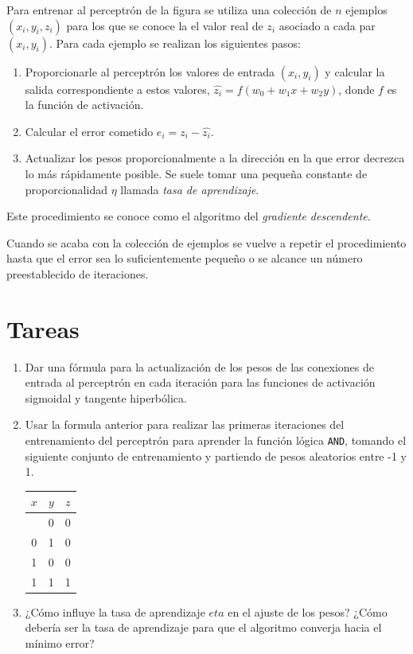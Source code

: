 \documentclass[
  a4paper,
]{scrreport}
\providecommand{\tightlist}{%
  \setlength{\itemsep}{0pt}\setlength{\parskip}{0pt}}\usepackage{longtable,booktabs,array}
\begin{document}
Para entrenar al perceptrón de la figura se utiliza una colección de
\(n\) ejemplos \((x_i,y_i,z_i)\) para los que se conoce la el valor real
de \(z_i\) asociado a cada par \((x_i,y_i)\). Para cada ejemplo se
realizan los siguientes pasos:

\begin{enumerate}
\def\labelenumi{\arabic{enumi}.}
\tightlist
\item
  Proporcionarle al perceptrón los valores de entrada \((x_i,y_i)\) y
  calcular la salida correspondiente a estos valores,
  \(\hat{z_i} = f(w_0+w_1x+w_2y)\), donde \(f\) es la función de
  activación.
\item
  Calcular el error cometido \(e_i = z_i-\hat{z_i}\).
\item
  Actualizar los pesos proporcionalmente a la dirección en la que error
  decrezca lo más rápidamente posible. Se suele tomar una pequeña
  constante de proporcionalidad \(\eta\) llamada \emph{tasa de
  aprendizaje}.
\end{enumerate}

Este procedimiento se conoce como el algoritmo del \emph{gradiente
descendente}.

Cuando se acaba con la colección de ejemplos se vuelve a repetir el
procedimiento hasta que el error sea lo suficientemente pequeño o se
alcance un número preestablecido de iteraciones.

\hypertarget{tareas-6}{%
\section{Tareas}\label{tareas-6}}

\begin{enumerate}
\def\labelenumi{\arabic{enumi}.}
\item
  Dar una fórmula para la actualización de los pesos de las conexiones
  de entrada al perceptrón en cada iteración para las funciones de
  activación sigmoidal y tangente hiperbólica.
\item
  Usar la formula anterior para realizar las primeras iteraciones del
  entrenamiento del perceptrón para aprender la función lógica
  \texttt{AND}, tomando el siguiente conjunto de entrenamiento y
  partiendo de pesos aleatorios entre -1 y 1.

  \begin{longtable}[]{@{}ccc@{}}
  \toprule\noalign{}
  \(x\) & \(y\) & \(z\) \\
  \midrule\noalign{}
  \endhead
  \bottomrule\noalign{}
  \endlastfoot
  0 & 0 & 0 \\
  0 & 1 & 0 \\
  1 & 0 & 0 \\
  1 & 1 & 1 \\
  \end{longtable}
\item
  ¿Cómo influye la tasa de aprendizaje \(eta\) en el ajuste de los
  pesos? ¿Cómo debería ser la tasa de aprendizaje para que el algoritmo
  converja hacia el mínimo error?
\end{enumerate}
\end{document}
